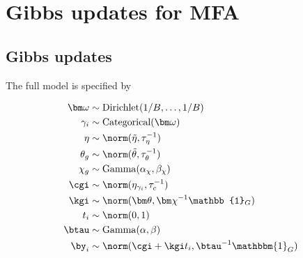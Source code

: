\chapter{Gibbs updates for MFA}





\section{Gibbs updates}

The full model is specified by


\begin{equation} \label{eq:mfamodel}
\begin{aligned}
\bm \omega & \sim \text{Dirichlet}(1 / B, \ldots, 1 / B) \\
\gamma_i & \sim \text{Categorical}(\bm \omega) \\
\eta & \sim \norm(\tilde{\eta}, \tau_\eta^{-1}) \\
\theta_g & \sim \norm(\tilde{\theta}, \tau_\theta^{-1}) \\
\chi_g & \sim \mathrm{Gamma}(\alpha_\chi, \beta_\chi) \\
\cgi & \sim \norm(\eta_{\gamma_i}, \tau_c^{-1}) \\
\kgi & \sim \norm(\bm \theta, \bm \chi^{-1} \mathbb{1}_G) \\
t_i & \sim \norm(0, 1) \\
\btau & \sim \mathrm{Gamma}(\alpha, \beta) \\
\by_i & \sim \norm(\cgi + \kgi t_i, \btau^{-1} \mathbbm{1}_G)
\end{aligned}
\end{equation}


